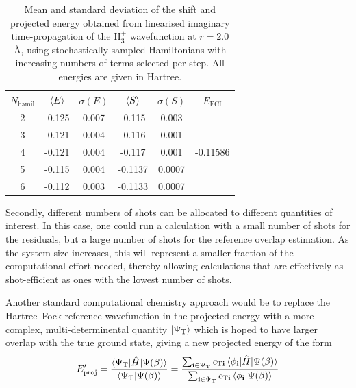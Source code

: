 \documentclass[%
 reprint,
 amsmath,amssymb,
 aps,
]{revtex4-2}
\begin{document}
{\begin{table}
    \centering
    \caption{\small \justifying Mean and standard deviation of the shift and projected energy obtained from linearised imaginary time-propagation of the H$_3^+$ wavefunction at $r=2.0$ \r{A}, using stochastically sampled Hamiltonians with increasing numbers of terms selected per step. { All energies are given in Hartree.}}
    \label{tab:hamil}
    \begin{tabular}{c|c|c|c|c|c}
      $N_\mathrm{hamil}$ &  $\braket{E}$ & $\sigma(E)$ & $\braket{S}$ & $\sigma(S)$&$E_\mathrm{FCI}$\\
      \hline
         2&-0.125&0.007&-0.115&0.003&\multirow{5}{*}{-0.11586}\\
         3& -0.121& 0.004& -0.116& 0.001&\\
         4 & -0.121& 0.004& -0.117& 0.001&\\
         5 & -0.115& 0.004& -0.1137& 0.0007&\\
         6 & -0.112 & 0.003 & -0.1133& 0.0007&\\
         \hline
    \end{tabular}
    
\end{table}


Secondly, different numbers of shots can be allocated to different quantities of interest. In this case, one could run a calculation with a small number of shots for the residuals, but a large number of shots for the reference overlap estimation. As the system size increases, this will represent a smaller fraction of the computational effort needed, thereby allowing calculations that are effectively as shot-efficient as ones with the lowest number of shots.

Another standard computational chemistry approach would be to replace the Hartree--Fock reference wavefunction in the projected energy with a more complex, multi-determinental quantity $\ket{\Psi_\mathrm{T}}$ which is hoped to have larger overlap with the true ground state, giving a new projected energy of the form
\begin{equation}
    E'_\mathrm{proj} = \frac{\braket{\Psi_\mathrm{T}|\hat H| \Psi(\beta)}}{\braket{\Psi_\mathrm{T}|\Psi(\beta)}} = \frac{\sum_{\mathbf{i} \in \Psi_\mathrm{T}}c_{\mathrm{T}\mathbf{i}}\braket{\phi_\mathbf{i}|\hat H|\Psi(\beta)}}{\sum_{\mathbf{i} \in \Psi_\mathrm{T}}c_{\mathrm{T}\mathbf{i}}\braket{\phi_\mathbf{i}|\Psi(\beta)}}
\end{equation}

}
\end{document}
